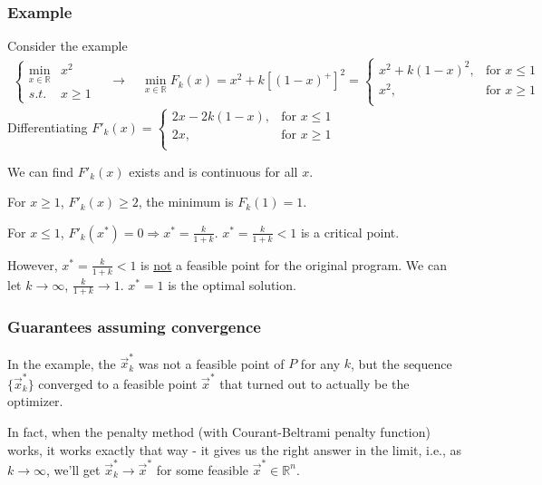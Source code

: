 \documentclass[11pt,a4paper]{article}
\begin{document}
\subsubsection{Example}
Consider the example
\begin{equation}
    \begin{aligned}
        \left\{\begin{matrix}
        \min_{x\in \mathbb{R}}& x^2\\
        s.t.& x\geq 1
        \end{matrix}\right.\quad \rightarrow\quad \min_{x\in \mathbb{R}} F_k(x)=x^2+k[(1-x)^+]^2=\left\{\begin{matrix}
            x^2+k(1-x)^2,&\text{for }x\leq 1\\
            x^2,&\text{for }x\geq 1\\
        \end{matrix}\right.
    \end{aligned}
    \nonumber
\end{equation}
Differentiating $F'_k(x)=\left\{\begin{matrix}
    2x-2k(1-x),&\text{for }x\leq 1\\
    2x,&\text{for }x\geq 1\\
\end{matrix}\right.$

We can find $F'_k(x)$ exists and is continuous for all $x$.

For $x\geq 1$, $F'_k(x)\geq 2$, the minimum is $F_k(1)=1$.

For $x\leq 1$, $F'_k(x^*)=0 \Rightarrow x^*=\frac{k}{1+k}$. $x^*=\frac{k}{1+k}<1$ is a critical point.

However, $x^*=\frac{k}{1+k}<1$ is \underline{not} a feasible point for the original program. We can let $k \rightarrow \infty$, $\frac{k}{1+k} \rightarrow 1$. $x^*=1$ is the optimal solution.

\subsubsection{Guarantees assuming convergence}
In the example, the $\vec{x}^*_k$ was not a feasible point of $P$ for any $k$, but the sequence $\{\vec{x}^*_k\}$ converged to a feasible point $\vec{x}^*$ that turned out to actually be the optimizer.

In fact, when the penalty method (with Courant-Beltrami penalty function) works, it works exactly that way - it gives us the right answer in the limit, i.e., as $k \rightarrow \infty$, we'll get $\vec{x}_k^* \rightarrow \vec{x}^*$ for some feasible $\vec{x}^* \in \mathbb{R}^n$.
\end{document}
